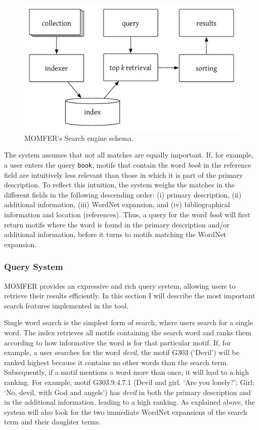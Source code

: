 \begin{figure}
\centering
\includegraphics[width=\textwidth]{images/index-schema.pdf}
\caption{MOMFER's Search engine schema.}
\label{fig:index-schema}
\end{figure}

The system assumes that not all matches are equally important. If, for example, a user enters the query \texttt{book}, motifs that contain the word \emph{book} in the reference field are intuitively less relevant than those in which it is part of the primary description. To reflect this intuition, the system weighs the matches in the different fields in the following descending order: (i) primary description, (ii) additional information, (iii) WordNet expansion, and (iv) bibliographical information and location (references). Thus, a query for the word \emph{book} will first return motifs where the word is found in the primary description and/or additional information, before it turns to motifs matching the WordNet expansion.

\subsubsection{Query System}

MOMFER provides an expressive and rich query system, allowing users to retrieve their results efficiently. In this section I will describe the most important search features implemented in the tool.

Single word search is the simplest form of search, where users search for a single word. The index retrieves all motifs containing the search word and ranks them according to how informative the word is for that particular motif. If, for example, a user searches for the word \emph{devil}, the motif G303 (`Devil') will be ranked highest because it contains no other words than the search term. Subsequently, if a motif mentions a word more than once, it will lead to a high ranking. For example, motif G303.9.4.7.1 (Devil and girl. `Are you lonely?'; Girl: `No, devil, with God and angels') has \emph{devil} in both the primary description and in the additional information, leading to a high ranking. As explained above, the system will also look for the two immediate WordNet expansions of the search term and their daughter terms.

